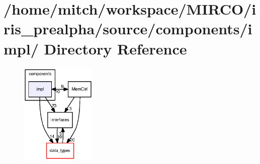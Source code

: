 \section{/home/mitch/workspace/MIRCO/iris\_\-prealpha/source/components/impl/ Directory Reference}
\label{dir_3fabc0dad3271806251084821e8ed172}


\nopagebreak
\begin{figure}[H]
\begin{center}
\leavevmode
\includegraphics[width=103pt]{dir_3fabc0dad3271806251084821e8ed172_dep}
\end{center}
\end{figure}
